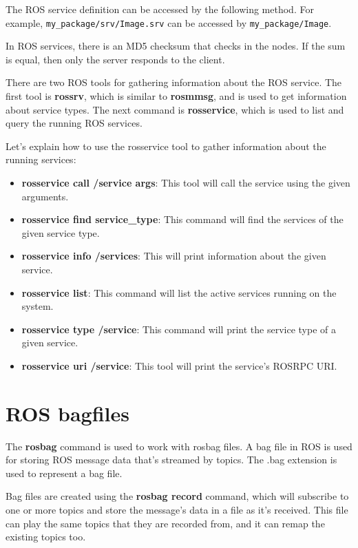 \documentclass[../../main]{subfiles}
\begin{document}
The ROS service definition can be accessed by the following method. For example, \texttt{my\_package/srv/Image.srv} can be accessed by \texttt{my\_package/Image}.

In ROS services, there is an MD5 checksum that checks in the nodes. If the sum is equal, then only the server responds to the client.

There are two ROS tools for gathering information about the ROS service. The first tool is \textbf{rossrv}, which is similar to \textbf{rosmmsg}, and is used to get information about service types. The next command is \textbf{rosservice}, which is used to list and query the running ROS services.

Let's explain how to use the rosservice tool to gather information about the running services:
\begin{itemize}
    \item \textbf{rosservice call /service args}: This tool will call the service using the given arguments.
    \item \textbf{rosservice find service\_type}: This command will find the services of the given service type.
    \item \textbf{rosservice info /services}: This will print information about the given service.
    \item \textbf{rosservice list}: This command will list the active services running on the system.
    \item \textbf{rosservice type /service}: This command will print the service type of a given service.
    \item \textbf{rosservice uri /service}: This tool will print the service's ROSRPC URI.
\end{itemize}

\section{ROS bagfiles}

The \textbf{rosbag} command is used to work with rosbag files. A bag file in ROS is used for storing ROS message data that's streamed by topics. The .bag extension is used to represent a bag file.

Bag files are created using the \textbf{rosbag record} command, which will subscribe to one or more topics and store the message's data in a file as it's received. This file can play the same topics that they are recorded from, and it can remap the existing topics too.
\end{document}

